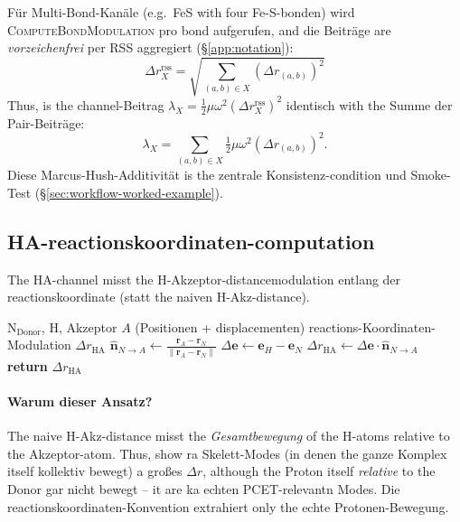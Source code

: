 \documentclass[11pt,a4paper,twoside]{article}
\theoremstyle{remark}
\begin{document}
F\"ur Multi-Bond-Kan\"ale (e.g.\ FeS with four Fe-S-bonden) wird
\textsc{ComputeBondModulation} pro bond aufgerufen, and die
Beitr\"age are \emph{vorzeichenfrei} per RSS aggregiert
(\S\ref{app:notation}):
\begin{equation}
  \Delta r_X^\text{rss} = \sqrt{\sum_{(a,b) \in X} (\Delta r_{(a,b)})^2}
\end{equation}
Thus, is the channel-Beitrag $\lambda_X = \tfrac{1}{2}\mu\omega^2
(\Delta r_X^\text{rss})^2$ identisch with the Summe der
Pair-Beitr\"age:
\begin{equation}
  \lambda_X = \sum_{(a,b) \in X} \tfrac{1}{2}\mu\omega^2 (\Delta r_{(a,b)})^2.
  \label{eq:reorg-additivity}
\end{equation}
Diese Marcus-Hush-Additivit\"at is the zentrale Konsistenz-condition
und Smoke-Test (\S\ref{sec:workflow-worked-example}).

\subsection{HA-reactionskoordinaten-computation}
\label{app:pseudo-ha}

The HA-channel misst the H-Akzeptor-distancemodulation entlang der
reactionskoordinate (statt the naiven H-Akz-distance).

\begin{algorithm}[H]
\caption{\textsc{ComputeHAReactionCoord}}
\begin{algorithmic}[1]
\Require N$_\text{Donor}$, H, Akzeptor $A$ (Positionen + displacementen)
\Ensure reactions-Koordinaten-Modulation $\Delta r_\text{HA}$
\State $\hat{\mathbf{n}}_{N\to A} \gets
       \frac{\mathbf{r}_A - \mathbf{r}_N}
            {\|\mathbf{r}_A - \mathbf{r}_N\|}$
\State $\Delta\mathbf{e} \gets \mathbf{e}_H - \mathbf{e}_N$
\State $\Delta r_\text{HA} \gets \Delta\mathbf{e} \cdot
       \hat{\mathbf{n}}_{N\to A}$
\State \textbf{return} $\Delta r_\text{HA}$
\end{algorithmic}
\end{algorithm}

\paragraph{Warum dieser Ansatz?}
The naive H-Akz-distance misst the \emph{Gesamtbewegung} of the H-atoms
relative to the Akzeptor-atom. Thus, show ra Skelett-Modes (in
denen the ganze Komplex itself kollektiv bewegt) a gro{\ss}es
$\Delta r$, although the Proton itself \emph{relative} to the Donor gar nicht
bewegt -- it are ka echten PCET-relevantn Modes. Die
reactionskoordinaten-Konvention extrahiert only the echte
Protonen-Bewegung.
\end{document}

